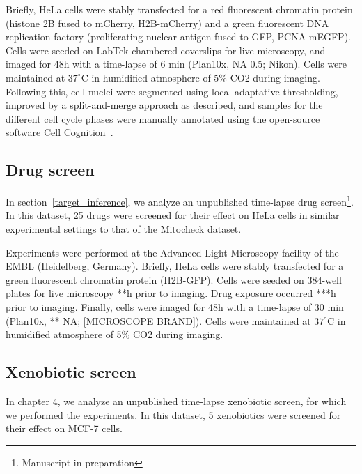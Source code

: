 Briefly, HeLa cells were stably transfected for a red fluorescent chromatin protein (histone 2B fused to mCherry, H2B-mCherry) and a green fluorescent DNA replication factory (proliferating nuclear antigen fused to GFP, PCNA-mEGFP). Cells were seeded on LabTek chambered coverslips for live microscopy, and imaged for 48h with a time-lapse of 6 min (Plan10x, NA 0.5; Nikon). Cells were maintained at $37^\circ$C in humidified atmosphere of 5\% CO2 during imaging. Following this, cell nuclei were segmented using local adaptative thresholding, improved by a split-and-merge approach as described, and samples for the different cell cycle phases were manually annotated using the open-source software Cell Cognition~\cite{cellcognition}.
%
\subsection{Drug screen}
In section~\ref{target_inference}, we analyze an unpublished time-lapse drug screen\footnote{Manuscript in preparation}. In this dataset, 25 drugs were screened for their effect on HeLa cells in similar experimental settings to that of the Mitocheck dataset.

Experiments were performed at the Advanced Light Microscopy facility of the EMBL (Heidelberg, Germany). Briefly, HeLa cells were stably transfected for a green fluorescent chromatin protein (H2B-GFP). Cells were seeded on 384-well plates for live microscopy **h prior to imaging. Drug exposure occurred ***h prior to imaging. Finally, cells were imaged for 48h with a time-lapse of 30 min (Plan10x, ** NA; [MICROSCOPE BRAND]). Cells were maintained at $37^\circ$C in humidified atmosphere of 5\% CO2 during imaging.

\subsection{Xenobiotic screen}
In chapter 4, we analyze an unpublished time-lapse xenobiotic screen, for which we performed the experiments. In this dataset, 5 xenobiotics were screened for their effect on MCF-7 cells.

